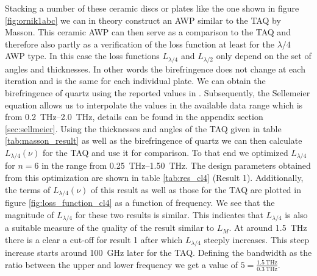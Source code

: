 Stacking a number of these ceramic discs or plates like the one shown in figure \ref{fig:ornik1abc} we can in theory construct an AWP similar to the TAQ by Masson. This ceramic AWP can then serve as a comparison to the TAQ and therefore also partly as a verification of the loss function at least for the $\lambda/4$ AWP type. In this case the loss functions $L_{\lambda/4}$ and $L_{\lambda/2}$ only depend on the set of angles and thicknesses. In other words the birefringence does not change at each iteration and is the same for each individual plate. We can obtain the birefringence of quartz using the reported values in \cite{DGrischkowsky1990}. Subsequently, the Sellemeier equation allows us to interpolate the values in the available data range which is from \SIrange{0.2}{2.0}{\tera \hertz}, details can be found in the appendix section \ref{sec:sellmeier}. Using the thicknesses and angles of the TAQ given in table \ref{tab:masson_result} as well as the birefringence of quartz we can then calculate $L_{\lambda/4}(\nu)$ for the TAQ and use it for comparison. To that end we optimized $L_{\lambda/4}$ for $n=6$ in the range from \SIrange{0.25}{1.50}{\tera \hertz}. The design parameters obtained from this optimization are shown in table \ref{tab:res_cl4} (Result 1). Additionally, the terms of $L_{\lambda/4}(\nu)$ of this result as well as those for the TAQ are plotted in figure \ref{fig:loss_function_cl4} as a function of frequency. We see that the magnitude of $L_{\lambda/4}$ for these two results is similar. This indicates that $L_{\lambda/4}$ is also a suitable measure of the quality of the result similar to $L_{M}$. At around \SI{1.5}{\tera \hertz} there is a clear a cut-off for result 1 after which $L_{\lambda/4}$ steeply increases. This steep increase starts around \SI{100}{\giga \hertz} later for the TAQ. Defining the bandwidth as the ratio between the upper and lower frequency we get a value of  $5=\frac{\SI{1.5}{\tera \hertz}}{\SI{0.3}{\tera \hertz}}$. 

\begin{table}[ht]
    \centering
    
    \caption{Design parameters for result 1 and 2. Both results are obtained through the optimization of $L_{\lambda/4}$ for $n=6$. In the case of result 1 the frequency range for the optimization was limited to \SIrange[range-phrase=-, range-units=single]{0.25}{1.50}{\tera \hertz} while for result 2 the range was set to \SIrange[range-phrase=-, range-units=single]{0.50}{2.25}{\tera \hertz}.}
    \label{tab:res_cl4}
\end{table}

